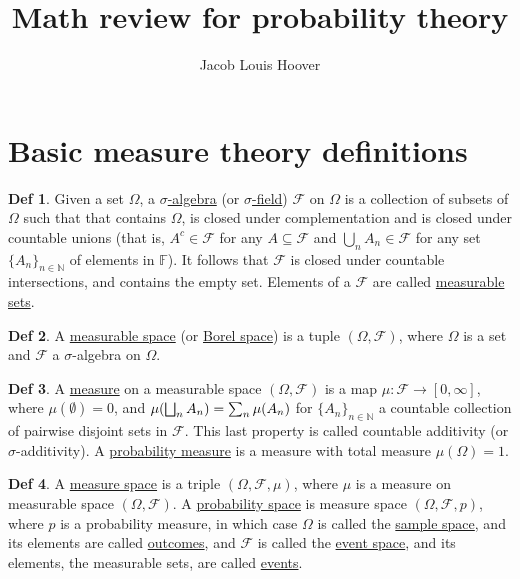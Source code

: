 \documentclass[a4paper]{article}
\theoremstyle{definition}
\newtheorem*{definition}{Def}
\newcommand\key\uline%
\renewcommand\right\mright%
\renewcommand\left\mleft%
\begin{document}
\title{Math review for probability theory}
\author{Jacob Louis Hoover}
\date{}


\section*{Basic measure theory definitions}%
\label{sec:measure_theory}
\nocite{billingsley.p:1995, lanchier.n:2017ch1}

\begin{definition}
  Given a set $\Omega$, a \key{$\sigma$-algebra} (or \key{$\sigma$-field})
  $\mathcal{F}$ on $\Omega$ is a collection of subsets of $\Omega$  such that
  that contains $\Omega$, is closed under complementation and is closed under
  countable unions (that is, $A^c\in \mathcal{F}$ for any $A\subseteq
  \mathcal{F}$ and $\bigcup_n A_n \in \mathcal{F}$ for any set
  ${\{A_n\}}_{n\in\mathbb{N}}$ of elements in $\mathbb{F}$). It follows that
  $\mathcal{F}$ is closed under countable intersections, and contains the empty
  set. Elements of a $\mathcal F$ are called \key{measurable sets}.
\end{definition}

\begin{definition}
  A \key{measurable space} (or \key{Borel space}) is a tuple $(\Omega,
  \mathcal{F})$, where $\Omega$ is a set and $\mathcal{F}$ a $\sigma$-algebra on
  $\Omega$.
\end{definition}

\begin{definition}
  A \key{measure} on a measurable space $(\Omega,\mathcal{F})$ is a map
  $\mu:\mathcal{F}\to [0,\infty]$, where $\mu(\emptyset) = 0$, and
  \(\mu\left(\bigsqcup_{n}A_n\right)=\sum_{n}\mu(A_n)\)
  for ${\{A_n\}}_{n\in \mathbb{N}}$ a countable collection of pairwise disjoint
  sets in $\mathcal{F}$. This last property is called countable additivity (or
  $\sigma$-additivity). A \key{probability measure} is a measure with total
  measure $\mu(\Omega)=1$.
\end{definition}

\begin{definition}
  A \key{measure space} is a triple $(\Omega,\mathcal{F},\mu)$, where $\mu$ is a
  measure on measurable space $(\Omega,\mathcal{F})$. A \key{probability space}
  is measure space $(\Omega,\mathcal{F},p)$, where $p$ is a probability
  measure, in which case $\Omega$ is called the \key{sample space}, and
    its elements are called \key{outcomes}, and $\mathcal{F}$ is called the
    \key{event space}, and its elements, the measurable sets, are called
  \key{events}.
\end{definition}
\end{document}
